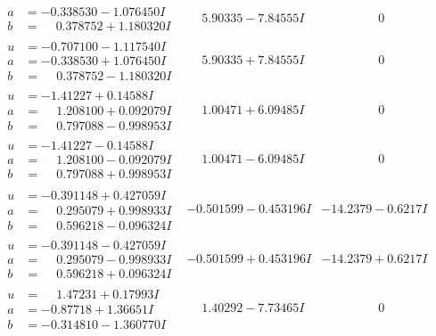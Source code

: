 \documentclass[1p]{elsarticle_modified}
\theoremstyle{definition}
\begin{document}
$$\begin{array}{c|c|c}
\begin{aligned}
a &= -0.338530 - 1.076450 I \\
b &= \phantom{-}0.378752 + 1.180320 I\end{aligned}
 & \phantom{-}5.90335 - 7.84555 I & \phantom{-0.000000 } 0 \\ \hline\begin{aligned}
u &= -0.707100 - 1.117540 I \\
a &= -0.338530 + 1.076450 I \\
b &= \phantom{-}0.378752 - 1.180320 I\end{aligned}
 & \phantom{-}5.90335 + 7.84555 I & \phantom{-0.000000 } 0 \\ \hline\begin{aligned}
u &= -1.41227 + 0.14588 I \\
a &= \phantom{-}1.208100 + 0.092079 I \\
b &= \phantom{-}0.797088 - 0.998953 I\end{aligned}
 & \phantom{-}1.00471 + 6.09485 I & \phantom{-0.000000 } 0 \\ \hline\begin{aligned}
u &= -1.41227 - 0.14588 I \\
a &= \phantom{-}1.208100 - 0.092079 I \\
b &= \phantom{-}0.797088 + 0.998953 I\end{aligned}
 & \phantom{-}1.00471 - 6.09485 I & \phantom{-0.000000 } 0 \\ \hline\begin{aligned}
u &= -0.391148 + 0.427059 I \\
a &= \phantom{-}0.295079 + 0.998933 I \\
b &= \phantom{-}0.596218 - 0.096324 I\end{aligned}
 & -0.501599 - 0.453196 I & -14.2379 - 0.6217 I \\ \hline\begin{aligned}
u &= -0.391148 - 0.427059 I \\
a &= \phantom{-}0.295079 - 0.998933 I \\
b &= \phantom{-}0.596218 + 0.096324 I\end{aligned}
 & -0.501599 + 0.453196 I & -14.2379 + 0.6217 I \\ \hline\begin{aligned}
u &= \phantom{-}1.47231 + 0.17993 I \\
a &= -0.87718 + 1.36651 I \\
b &= -0.314810 - 1.360770 I\end{aligned}
 & \phantom{-}1.40292 - 7.73465 I & \phantom{-0.000000 } 0 \\ \hline\begin{aligned}

\end{aligned}
\end{array}$$
\end{document}
